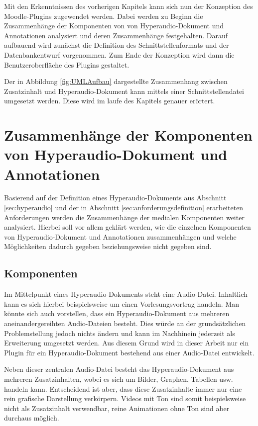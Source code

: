 Mit den Erkenntnissen des vorherigen Kapitels kann sich nun der Konzeption des Moodle-Plugins zugewendet werden. Dabei werden zu Beginn die Zusammenhänge der Komponenten von von Hyperaudio-Dokument und Annotationen analysiert und deren Zusammenhänge festgehalten. Darauf aufbauend wird zunächst die Definition des Schnittstellenformats und der Datenbankentwurf vorgenommen. Zum Ende der Konzeption wird dann die Benutzeroberfläche des Plugins gestaltet.

Der in Abbildung \ref{fig:UMLAufbau} dargestellte Zusammenhang zwischen Zusatzinhalt und Hyperaudio-Dokument kann mittels einer Schnittstellendatei umgesetzt werden. Diese wird im laufe des Kapitels genauer erörtert.

\section{Zusammenhänge der Komponenten von Hyperaudio-Dokument und Annotationen}
Basierend auf der Definition eines Hyperaudio-Dokuments aus Abschnitt \ref{sec:hyperaudio} und der in Abschnitt \ref{sec:anforderungsdefinition} erarbeiteten Anforderungen werden die Zusammenhänge der medialen Komponenten weiter analysiert. Hierbei soll vor allem geklärt werden, wie die einzelnen Komponenten von Hyperaudio-Dokument und Annotationen zusammenhängen und welche Möglichkeiten dadurch gegeben beziehungsweise nicht gegeben sind.


\subsection{Komponenten}
Im Mittelpunkt eines Hyperaudio-Dokuments steht eine Audio-Datei. Inhaltlich kann es sich hierbei beispielsweise um einen Vorlesungsvortrag handeln. Man könnte sich auch vorstellen, dass ein Hyperaudio-Dokument aus mehreren aneinandergereihten Audio-Dateien besteht. Dies würde an der grundsätzlichen Problemstellung jedoch nichts ändern und kann im Nachhinein jederzeit als Erweiterung umgesetzt werden. Aus diesem Grund wird in dieser Arbeit nur ein Plugin für ein Hyperaudio-Dokument bestehend aus einer Audio-Datei entwickelt.

Neben dieser zentralen Audio-Datei besteht das Hyperaudio-Dokument aus mehreren Zusatzinhalten, wobei es sich um Bilder, Graphen, Tabellen usw. handeln kann. Entscheidend ist aber, dass diese Zusatzinhalte immer nur eine rein grafische Darstellung verkörpern. Videos mit Ton sind somit beispielsweise nicht als Zusatzinhalt verwendbar, reine Animationen ohne Ton sind aber durchaus möglich.

